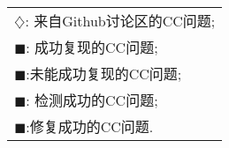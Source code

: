\begin{table}[htbp]
\begin{tabular}{|l|}
		\multicolumn{1}{l}{{\color{Status4}$\diamondsuit$}: 来自Github讨论区的CC问题;}\\
		\multicolumn{1}{l}{{\color{Status9}$\blacksquare$}: 成功复现的CC问题;}\\
		\multicolumn{1}{l}{{\color{Status7}$\blacksquare$}:未能成功复现的CC问题;}\\
		\multicolumn{1}{l}{{\color{Status10}$\blacksquare$}:  \tool{}检测成功的CC问题;}\\
		\multicolumn{1}{l}{{\color{Status5}$\blacksquare$}:\tool{}修复成功的CC问题.}\\
	\end{tabular}
	\egroup
	\label{tab:issues}
\end{table}